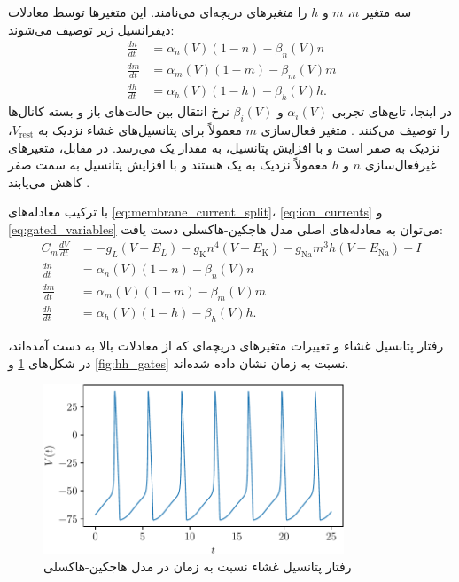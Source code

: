 سه متغیر
\( n \)، \( m \) و \( h \)
را متغیرهای دریچه‌ای می‌نامند.
این متغیرها توسط معادلات دیفرانسیل زیر توصیف می‌شوند:
\begin{subequations} \label{eq:gated_variables}
    \begin{align}
        \frac{dn}{dt} & = \alpha_n(V) (1 - n) - \beta_n(V)n  \\
        \frac{dm}{dt} & = \alpha_m(V) (1 - m) - \beta_m(V)m  \\
        \frac{dh}{dt} & = \alpha_h(V) (1 - h) - \beta_h(V)h.
    \end{align}
\end{subequations}
در اینجا، تابع‌های تجربی
\( \alpha_{i}(V) \) و \( \beta_{i}(V) \)
نرخ انتقال بین حالت‌های باز و بسته کانال‌ها را توصیف می‌کنند
\cite{izhikevich2006}.
متغیر فعال‌سازی
\( m \)
معمولاً برای پتانسیل‌های غشاء نزدیک به
\( V_{\text{rest}} \)،
نزدیک به صفر است و با افزایش پتانسیل، به مقدار یک می‌رسد.
در مقابل، متغیرهای غیرفعال‌سازی
\( n \) و \( h \)
معمولاً نزدیک به یک هستند و با افزایش پتانسیل به سمت صفر کاهش می‌یابند
\cite{graben2008}.

با ترکیب معادله‌های
\ref{eq:membrane_current_split}، \ref{eq:ion_currents} و \ref{eq:gated_variables}
می‌توان به معادله‌های اصلی مدل هاجکین-هاکسلی دست یافت:
\begin{subequations}
    \begin{align}
        C_m \frac{dV}{dt} & = -g_{L} (V - E_{L}) - g_{\text{K}} n^4 (V - E_{\text{K}}) - g_{\text{Na}} m^3 h (V - E_{\text{Na}}) + I \\
        \frac{dn}{dt}     & = \alpha_n(V) (1 - n) - \beta_n(V)n                                                                      \\
        \frac{dm}{dt}     & = \alpha_m(V) (1 - m) - \beta_m(V)m                                                                      \\
        \frac{dh}{dt}     & = \alpha_h(V) (1 - h) - \beta_h(V)h.
    \end{align}
\end{subequations}

رفتار پتانسیل غشاء و تغییرات متغیرهای دریچه‌ای که از معادلات بالا به دست آمده‌اند، در شکل‌های
\ref{fig:hh} و \ref{fig:hh_gates}
نسبت به زمان نشان داده شده‌اند.

\begin{figure}[!ht]
    \centering
    \includegraphics[width=0.8\textwidth]{figures/HH}
    \caption{رفتار پتانسیل غشاء نسبت به زمان در مدل هاجکین-هاکسلی}
    \label{fig:hh}
\end{figure}


